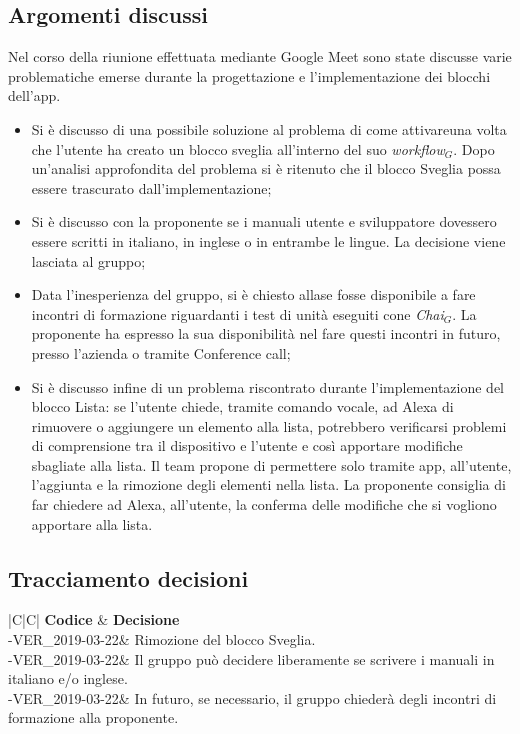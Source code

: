 \documentclass[a4paper,12pt]{article}
\begin{document}
	\subsection{Argomenti discussi}
	Nel corso della riunione effettuata mediante Google Meet sono state discusse varie problematiche emerse durante la progettazione e l'implementazione dei blocchi dell'app.
	\begin{itemize}
		\item {Si è discusso di una possibile soluzione al problema di come attivareuna volta che l'utente ha creato un blocco sveglia all'interno del suo \textit{workflow$_{G}$}. Dopo un'analisi approfondita del problema si è ritenuto che il blocco Sveglia possa essere trascurato dall'implementazione;}
		\item {Si è discusso con la proponente se i manuali utente e sviluppatore dovessero essere scritti in italiano, in inglese o in entrambe le lingue. La decisione viene lasciata al gruppo;}
		\item {Data l'inesperienza del gruppo, si è chiesto allase fosse disponibile a fare incontri di formazione riguardanti i test di unità eseguiti cone \textit{Chai$_{G}$}. La proponente ha espresso la sua disponibilità nel fare questi incontri in futuro, presso l'azienda o tramite Conference call;}
		\item {Si è discusso infine di un problema riscontrato durante l'implementazione del blocco Lista: se l'utente chiede, tramite comando vocale, ad Alexa di rimuovere o aggiungere un elemento alla lista, potrebbero verificarsi problemi di comprensione tra il dispositivo e l'utente e così apportare modifiche sbagliate alla lista. Il team propone di permettere solo tramite app, all'utente, l'aggiunta e la rimozione degli elementi nella lista. La proponente consiglia di far chiedere ad Alexa, all'utente, la conferma delle modifiche che si vogliono apportare alla lista.}
	\end{itemize}
	\subsection{Tracciamento decisioni}
	\begin{table}[tbph]
		\centering
		\begin{tabularx}{\textwidth}{|C|C|}
			\hline
			\textbf{Codice } & \textbf{Decisione} \\
			-VER\_2019-03-22& Rimozione del blocco Sveglia.\\
			-VER\_2019-03-22& Il gruppo può decidere liberamente se scrivere i manuali in italiano e/o inglese.\\
			-VER\_2019-03-22& In futuro, se necessario, il gruppo chiederà degli incontri di formazione alla proponente.\\
			\hline
		\end{tabularx}
		\caption{Tracciamento decisioni}
	\end{table}
	\label{LastPage}
\end{document}
